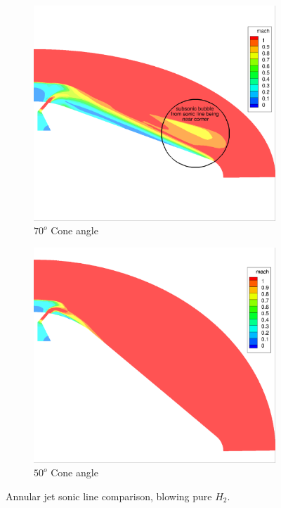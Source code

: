 \begin{figure}[h]
  \centering
  \begin{subfigure}[b]{0.45\textwidth}
    \centering
    \includegraphics[width=\textwidth]{figures/sonic-bubble/sonic_bubble.png}
    \caption{$70^o$ Cone angle}
    \label{fig:70-deg-cone}
  \end{subfigure}
  \begin{subfigure}[b]{0.45\textwidth}
    \centering
    \includegraphics[width=\textwidth]{figures/sonic-bubble/no_bubble.png}
    \caption{$50^o$ Cone angle}
    \label{fig:50-deg-cone}
  \end{subfigure}
  \caption{Annular jet sonic line comparison, blowing pure $H_2$.}
  \label{fig:cone-angle-comp}
\end{figure}
